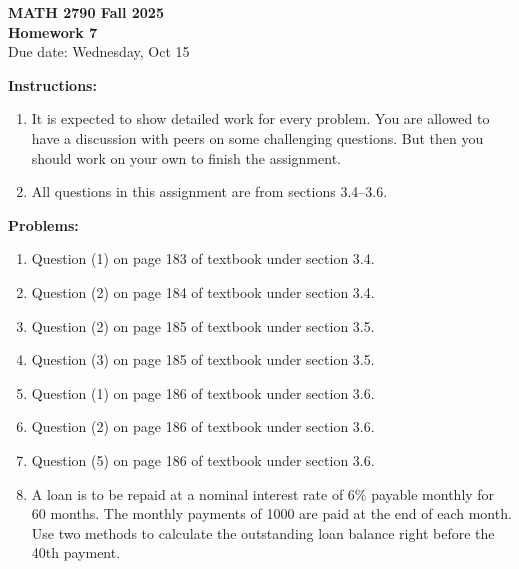 \documentclass[12pt]{article}
\begin{document}
\begin{center}
\textbf{\Large MATH 2790 Fall 2025}\\[1em]
\textbf{\Large Homework 7}\\[0.5em]
Due date: Wednesday, Oct 15
\end{center}

\bigskip

\textbf{Instructions:}

\begin{enumerate}[label=(\alph*)]
\item It is expected to show detailed work for every problem. You are allowed to have a
discussion with peers on some challenging questions. But then you should work on
your own to finish the assignment.

\item All questions in this assignment are from sections 3.4--3.6.
\end{enumerate}

\bigskip

\textbf{Problems:}

\begin{enumerate}
\item Question (1) on page 183 of textbook under section 3.4.

\item Question (2) on page 184 of textbook under section 3.4.

\item Question (2) on page 185 of textbook under section 3.5.

\item Question (3) on page 185 of textbook under section 3.5.

\item Question (1) on page 186 of textbook under section 3.6.

\item Question (2) on page 186 of textbook under section 3.6.

\item Question (5) on page 186 of textbook under section 3.6.

\item A loan is to be repaid at a nominal interest rate of 6\% payable monthly for 60
months. The monthly payments of 1000 are paid at the end of each month. Use two
methods to calculate the outstanding loan balance right before the 40th payment.
\end{enumerate}
\end{document}
